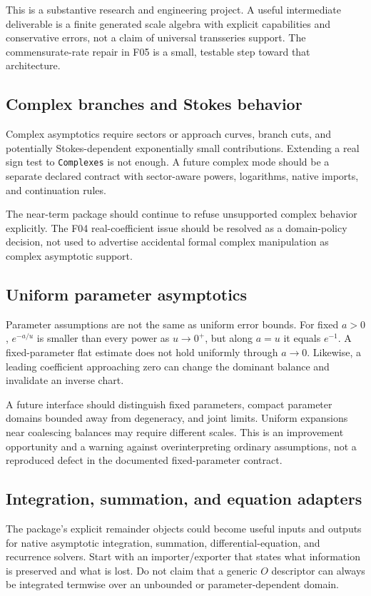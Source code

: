 This is a substantive research and engineering project. A useful intermediate deliverable is a finite generated scale algebra with explicit capabilities and conservative errors, not a claim of universal transseries support. The commensurate-rate repair in F05 is a small, testable step toward that architecture.

\subsection{Complex branches and Stokes behavior}

Complex asymptotics require sectors or approach curves, branch cuts, and potentially Stokes-dependent exponentially small contributions. Extending a real sign test to \texttt{Complexes} is not enough. A future complex mode should be a separate declared contract with sector-aware powers, logarithms, native imports, and continuation rules.

The near-term package should continue to refuse unsupported complex behavior explicitly. The F04 real-coefficient issue should be resolved as a domain-policy decision, not used to advertise accidental formal complex manipulation as complex asymptotic support.

\subsection{Uniform parameter asymptotics}

Parameter assumptions are not the same as uniform error bounds. For fixed $a>0$, $e^{-a/u}$ is smaller than every power as $u\to0^+$, but along $a=u$ it equals $e^{-1}$. A fixed-parameter flat estimate does not hold uniformly through $a\to0$. Likewise, a leading coefficient approaching zero can change the dominant balance and invalidate an inverse chart.

A future interface should distinguish fixed parameters, compact parameter domains bounded away from degeneracy, and joint limits. Uniform expansions near coalescing balances may require different scales. This is an improvement opportunity and a warning against overinterpreting ordinary assumptions, not a reproduced defect in the documented fixed-parameter contract.

\subsection{Integration, summation, and equation adapters}

The package's explicit remainder objects could become useful inputs and outputs for native asymptotic integration, summation, differential-equation, and recurrence solvers. Start with an importer/exporter that states what information is preserved and what is lost. Do not claim that a generic $O$ descriptor can always be integrated termwise over an unbounded or parameter-dependent domain.

